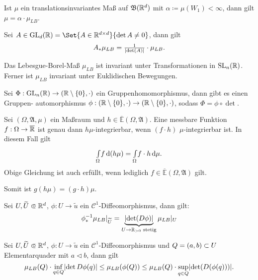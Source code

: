 \documentclass{cheat-sheet}
\newcommand{\Alg}{\mathfrak{A}} %
\newcommand{\Bor}{\mathfrak{B}} %
\newcommand{\E}{\mathbb{E}} %
\newcommand{\Cont}{\mathcal{C}} %
\theoremstyle{definition}
\newcommand{\IntO}[2]{\Int{\Omega}{}{#1}{#2}} %
\newcommand{\IntOmu}[1]{\Int{\Omega}{}{#1}{\mu}} %
\begin{document}
\begin{satz}
  Ist $\mu$ ein translationsinvariantes Maß auf $\Bor(\R^d)$ mit $\alpha \coloneqq \mu(W_1) < \infty$, dann gilt $\mu = \alpha \cdot \mu_{LB}$.
\end{satz}

\begin{satz}
  Sei $A \in \mathrm{GL}_d(\R) = \Set{ A \in \R^{d \times d} }{ \det A \not= 0 }$, dann gilt
  \[ A_* \mu_{LB} = \tfrac{1}{\lvert\det(A)\rvert} \cdot \mu_{LB}. \]
\end{satz}

\begin{satz}
  Das Lebesgue-Borel-Maß $\mu_{LB}$ ist invariant unter Transformationen in $\mathrm{SL}_n(\mathbb{R})$. Ferner ist $\mu_{LB}$ invariant unter Euklidischen Bewegungen.
\end{satz}


\begin{satz}
  Sei $\Phi : \mathrm{GL}_n(\mathbb{R}) \to (\mathbb{R} \setminus \{0\}, \cdot)$ ein Gruppenhomomorphismus, dann gibt es einen Gruppen- automorphismus $\phi : (\mathbb{R} \setminus \{0\}, \cdot) \to (\mathbb{R} \setminus \{0\}, \cdot)$, sodass $\Phi = \phi \circ \det$.
\end{satz}

\begin{satz}
  Sei $(\Omega, \Alg, \mu)$ ein Maßraum und $h \in \overline{\E}(\Omega, \Alg)$. Eine messbare Funktion $f : \Omega \to \overline{\mathbb{R}}$ ist genau dann $h\mu$-integrierbar, wenn $(f \cdot h)$ $\mu$-integrierbar ist. In diesem Fall gilt
  \[ \IntO{f}{(h \mu)} = \IntOmu{f \cdot h}. \]
  Obige Gleichung ist auch erfüllt, wenn lediglich $f \in \overline{\E}(\Omega, \Alg)$ gilt.
\end{satz}


\begin{bem}
  Somit ist $g (h \mu) = (g \cdot h) \mu$.
\end{bem}

\begin{satz}
  Sei $U, \widetilde{U} \opn \R^d$, $\phi : U \to \widetilde{u}$ ein $\Cont^1$-Diffeomorphismus, dann gilt:
    \[ \phi_*^{-1} \mu_{LB}|_{\widetilde{U}} = \underbrace{\lvert\det(D \phi)\rvert}_{U \to \mathbb{R}_{> 0} \text{ stetig}} \mu_{LB}|_U \]
\end{satz}

\begin{satz}
  Sei $U, \widetilde{U} \opn \R^d$, $\phi : U \to \widetilde{u}$ ein $\Cont^1$-Diffeomorphismus und $Q = \left( a, b \right) \subset U$ Elementarquader mit $a \lhd b$, dann gilt
  \[ \mu_{LB}(Q) \cdot \inf_{q \in Q} \lvert\det D \phi(q)\rvert \leq \mu_{LB}(\phi(Q)) \leq \mu_{LB}(Q) \cdot \sup_{q \in Q} \lvert\det(D(\phi(q)))\rvert. \]
\end{satz}
\end{document}
